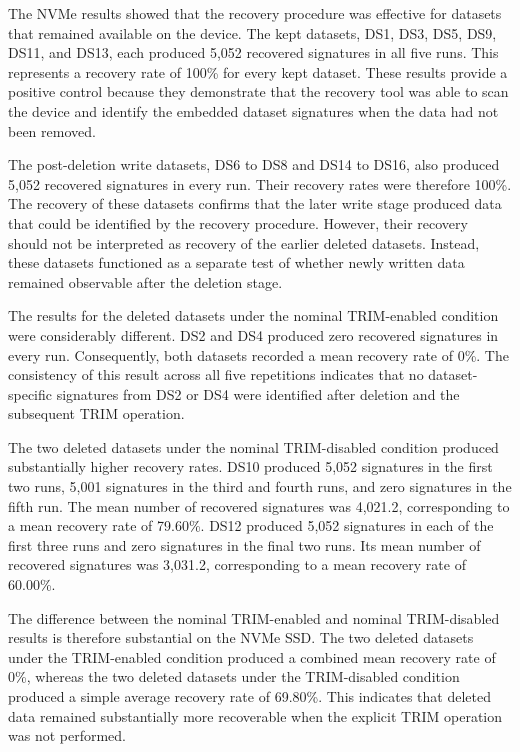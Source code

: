 The NVMe results showed that the recovery procedure was effective for datasets that remained available on the device. The kept datasets, DS1, DS3, DS5, DS9, DS11, and 
DS13, each produced 5,052 recovered signatures in all five runs. This represents a recovery rate of 100\% for every kept dataset. These results provide a positive 
control because they demonstrate that the recovery tool was able to scan the device and identify the embedded dataset signatures when the data had not been removed. 

The post-deletion write datasets, DS6 to DS8 and DS14 to DS16, also produced 5,052 recovered signatures in every run. Their recovery rates were therefore 100\%. The 
recovery of these datasets confirms that the later write stage produced data that could be identified by the recovery procedure. However, their recovery should not be 
interpreted as recovery of the earlier deleted datasets. Instead, these datasets functioned as a separate test of whether newly written data remained observable after 
the deletion stage. 

The results for the deleted datasets under the nominal TRIM-enabled condition were considerably different. DS2 and DS4 produced zero recovered signatures in every run. 
Consequently, both datasets recorded a mean recovery rate of 0\%. The consistency of this result across all five repetitions indicates that no dataset-specific 
signatures from DS2 or DS4 were identified after deletion and the subsequent TRIM operation.

The two deleted datasets under the nominal TRIM-disabled condition produced substantially higher recovery rates. DS10 produced 5,052 signatures in the first two runs, 
5,001 signatures in the third and fourth runs, and zero signatures in the fifth run. The mean number of recovered signatures was 4,021.2, corresponding to a mean 
recovery rate of 79.60\%. DS12 produced 5,052 signatures in each of the first three runs and zero signatures in the final two runs. Its mean number of recovered 
signatures was 3,031.2, corresponding to a mean recovery rate of 60.00\%. 

The difference between the nominal TRIM-enabled and nominal TRIM-disabled results is therefore substantial on the NVMe SSD. The two deleted datasets under the 
TRIM-enabled condition produced a combined mean recovery rate of 0\%, whereas the two deleted datasets under the TRIM-disabled condition produced a simple average 
recovery rate of 69.80\%. This indicates that deleted data remained substantially more recoverable when the explicit TRIM operation was not performed.

